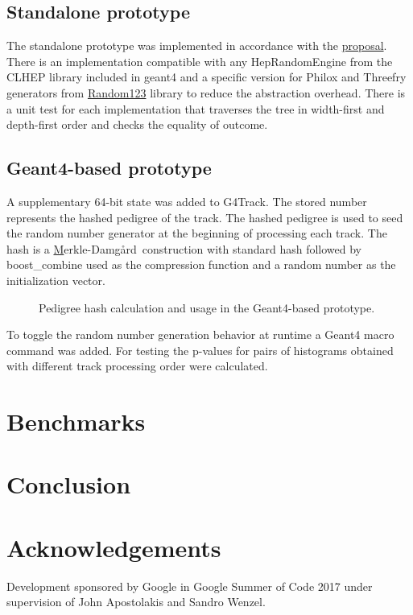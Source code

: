 \documentclass[a4paper, 12pt]{article} %
\newcommand{\MD}{Merkle-Damg\r{a}rd}
\begin{document}
  \subsection*{ Standalone prototype }
   The standalone prototype was implemented in accordance with the \href{https://sd57.github.io/g4dprng/gsoc-proposal-Savin.html}{proposal}.
   There is an implementation compatible with any HepRandomEngine from the CLHEP library included in geant4
   and a specific version for Philox and Threefry generators from
   \href{https://www.deshawresearch.com/resources_random123.html}{Random123} library
   to reduce the abstraction overhead.
   There is a unit test for each implementation that traverses the tree in width-first and depth-first order and checks the equality of outcome.

   \subsection*{ Geant4-based prototype }
   
  A supplementary 64-bit state was added to G4Track.
  The stored number represents the hashed pedigree of the track.
  The hashed pedigree is used to seed the random number generator at the beginning of processing each track.
  The hash is a \href{https://en.wikipedia.org/wiki/Merkle\%E2\%80\%93Damg\%C3\%A5rd\_construction}\MD\ construction with standard hash followed by boost\_combine used as the compression function and a random number as the initialization vector.
  \begin{figure}
   \scalebox{.5}{}
   \caption{Pedigree hash calculation and usage in the Geant4-based prototype.}
  \end{figure}
  To toggle the random number generation behavior at runtime a Geant4 macro command was added.
  For testing the p-values for pairs of histograms obtained with different track processing order were calculated.
  
 \section*{ Benchmarks }
 
 \section*{ Conclusion }
 
 \section*{ Acknowledgements }
  Development sponsored by Google in Google Summer of Code 2017 under supervision of John Apostolakis and Sandro Wenzel.
 
\end{document}
